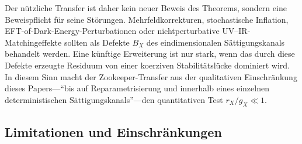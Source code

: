 \documentclass[aps,prd,twocolumn,superscriptaddress,nofootinbib]{revtex4-2}
\begin{document}
Der nützliche Transfer ist daher kein neuer Beweis des Theorems,
sondern eine Beweispflicht für seine Störungen.  Mehrfeldkorrekturen,
stochastische Inflation, EFT-of-Dark-Energy-Perturbationen oder
nichtperturbative UV--IR-Matchingeffekte sollten als Defekte $B_X$ des
eindimensionalen Sättigungskanals behandelt werden.  Eine künftige
Erweiterung ist nur stark, wenn das durch diese Defekte erzeugte
Residuum von einer koerziven Stabilitätslücke dominiert wird.  In
diesem Sinn macht der Zookeeper-Transfer aus der qualitativen
Einschränkung dieses Papers---``bis auf Reparametrisierung und
innerhalb eines einzelnen deterministischen Sättigungskanals''---den
quantitativen Test $r_X/g_X \ll 1$.

\subsection{Limitationen und Einschränkungen}
\end{document}
